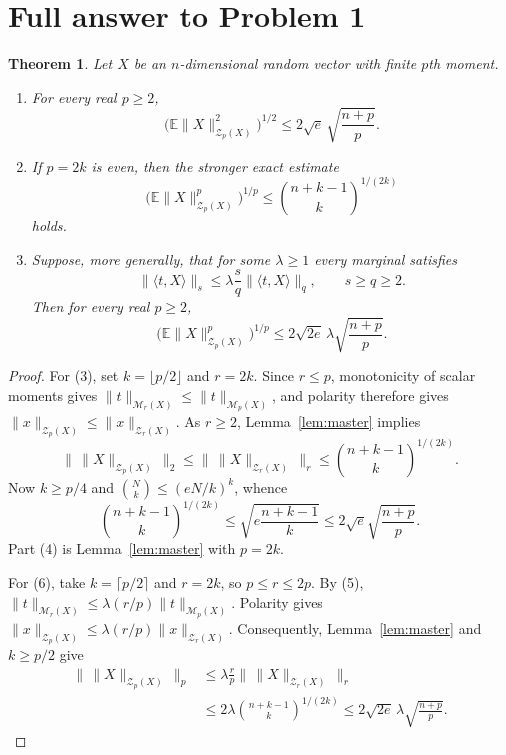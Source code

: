 \documentclass[10pt]{article}
\newtheorem{theorem}{Theorem}
\newcommand{\E}{\mathbb E}
\newcommand{\Mp}{\mathcal M}
\newcommand{\Zp}{\mathcal Z}
\begin{document}
\section{Full answer to Problem 1}
\begin{theorem}\label{thm:main}
Let $X$ be an $n$-dimensional random vector with finite $p$th moment.

\begin{enumerate}
\item For every real $p\ge2$,
\[
 \big(\E\|X\|_{\Zp_p(X)}^2\big)^{1/2}
 \le 2\sqrt e\,\sqrt{\frac{n+p}{p}}.                       \tag{3}
\]
\item If $p=2k$ is even, then the stronger exact estimate
\[
 \big(\E\|X\|_{\Zp_p(X)}^p\big)^{1/p}
 \le \binom{n+k-1}{k}^{1/(2k)}                              \tag{4}
\]
holds.
\item Suppose, more generally, that for some $\lambda\ge1$ every marginal
satisfies
\[
 \|\langle t,X\rangle\|_s
 \le\lambda\frac{s}{q}\|\langle t,X\rangle\|_q,
 \qquad s\ge q\ge2.                                       \tag{5}
\]
Then for every real $p\ge2$,
\[
 \big(\E\|X\|_{\Zp_p(X)}^p\big)^{1/p}
 \le2\sqrt{2e}\,\lambda\sqrt{\frac{n+p}{p}}.             \tag{6}
\]
\end{enumerate}
\end{theorem}

\begin{proof}
For (3), set $k=\lfloor p/2\rfloor$ and $r=2k$.  Since $r\le p$,
monotonicity of scalar moments gives
$\|t\|_{\Mp_r(X)}\le\|t\|_{\Mp_p(X)}$, and polarity therefore gives
$\|x\|_{\Zp_p(X)}\le\|x\|_{\Zp_r(X)}$.  As $r\ge2$, Lemma~\ref{lem:master}
implies
\[
 \|\,\|X\|_{\Zp_p(X)}\,\|_2
 \le\|\,\|X\|_{\Zp_r(X)}\,\|_r
 \le\binom{n+k-1}{k}^{1/(2k)}.
\]
Now $k\ge p/4$ and $\binom{N}{k}\le(eN/k)^k$, whence
\[
 \binom{n+k-1}{k}^{1/(2k)}
 \le\sqrt{e\frac{n+k-1}{k}}
 \le2\sqrt e\sqrt{\frac{n+p}{p}}.
\]
Part (4) is Lemma~\ref{lem:master} with $p=2k$.

For (6), take $k=\lceil p/2\rceil$ and $r=2k$, so $p\le r\le2p$.
By (5),
$\|t\|_{\Mp_r(X)}\le\lambda(r/p)\|t\|_{\Mp_p(X)}$.
Polarity gives
$\|x\|_{\Zp_p(X)}\le\lambda(r/p)\|x\|_{\Zp_r(X)}$.
Consequently, Lemma~\ref{lem:master} and $k\ge p/2$ give
\begin{align*}
 \|\,\|X\|_{\Zp_p(X)}\,\|_p
 &\le\lambda\frac rp\|\,\|X\|_{\Zp_r(X)}\,\|_r\\
 &\le2\lambda\binom{n+k-1}{k}^{1/(2k)}
 \le2\sqrt{2e}\,\lambda\sqrt{\frac{n+p}{p}}.
\end{align*}
\end{proof}
\end{document}

